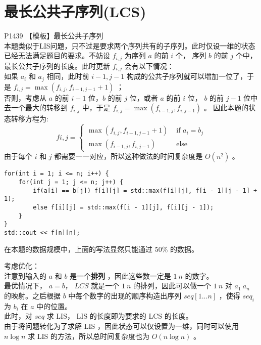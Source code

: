 \documentclass{beamer}
\newcommand{\fdf}[1]{\alert{\textbf{#1}}}
\begin{document}
\section{最长公共子序列(LCS)}
\begin{frame}
P1439 【模板】最长公共子序列\\ 
本题类似于LIS问题，只不过是要求两个序列共有的子序列。此时仅设一维的状态已经无法满足题目的要求。不妨设 $f_{i, j}$ 为序列 $a$ 的前 $i$ 个， 序列 $b$ 的前 $j$ 个中，最长公共子序列的长度。此时更新 $f_{i, j}$ 会有以下情况：\\
如果 $a_i$ 和 $a_j$ 相同，此时前 $i - 1, j - 1$ 构成的公共子序列就可以增加一位了，于是 $f_{i, j} = \max(f_{i, j}, f_{i - 1, j - 1} + 1)$ ； \\ 
否则，考虑从 $a$ 的前 $i - 1$ 位，$b$ 的前 $j$ 位，或者 $a$ 的前 $i$ 位， $b$ 的前 $j - 1$ 位中去一个最大的转移到 $f_{i, j}$ 中，于是 $f_{i, j} = \max(f_{i - 1, j}, f_{i, j - 1})$ 。
因此本题的状态转移方程为:
$$f{i, j} = \left\{\begin{matrix}
	\max(f_{i, j}, f_{i - 1, j - 1} + 1) & \text { if } a_i = b_j\\ 
	\max(f_{i - 1, j}, f_{i, j - 1}) & \text { else }
\end{matrix}\right.$$
由于每个 $i$ 和 $j$ 都需要一一对应，所以这种做法的时间复杂度是 $O(n^2)$ 。
\end{frame}
\begin{frame}[fragile]
\begin{onlyenv}
\begin{verbatim}
for(int i = 1; i <= n; i++) {
    for(int j = 1; j <= n; j++) {
        if(a[i] == b[j]) f[i][j] = std::max(f[i][j], f[i - 1][j - 1] + 1);
        else f[i][j] = std::max(f[i - 1][j], f[i][j - 1]);
    }
}
std::cout << f[n][n];
\end{verbatim}
\end{onlyenv}
在本题的数据规模中，上面的写法显然只能通过 $50\%$ 的数据。
\end{frame}
\begin{frame}
考虑优化： \\ 
注意到输入的 $a$ 和 $b$ 是一个\fdf{排列} ，因此这些数一定是 $1 ~ n$ 的数字。\\
最优情况下， $a = b$， $LCS$ 就是一个 $1 ~ n$ 的排列，因此可以做一个 $1 ~ n$ 对 $a_1 ~ a_n$ 的映射。之后根据 $b$ 中每个数字的出现的顺序构造出序列 $seq[1...n]$ ，使得 $seq_i$ 为 $b_i$ 在 $a$ 中的位置。 \\ 
此时，对 $seq$ 求 LIS， LIS 的长度即为要求的 LCS 的长度。 \\ 
由于将问题转化为了求解 LIS ，因此状态可以仅设置为一维，同时可以使用 $n \log n$ 求 LIS 的方法，所以总时间复杂度也为 $O(n \log n)$ 。
\end{frame}
\end{document}
